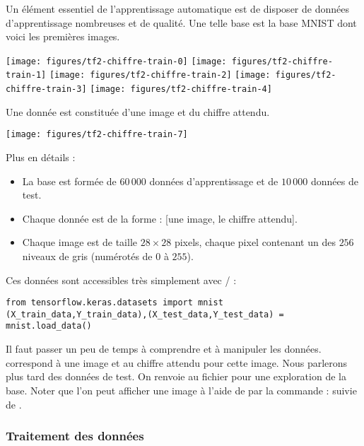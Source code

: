 \documentclass[11pt,class=report,crop=false]{standalone}
\begin{document}

Un élément essentiel de l'apprentissage automatique est de disposer de données d'apprentissage nombreuses et de qualité.
Une telle base est la base MNIST dont voici les premières images.
\begin{center}
\texttt{[image: figures/tf2-chiffre-train-0]}
\texttt{[image: figures/tf2-chiffre-train-1]}
\texttt{[image: figures/tf2-chiffre-train-2]}
\texttt{[image: figures/tf2-chiffre-train-3]}
\texttt{[image: figures/tf2-chiffre-train-4]}
\end{center}

Une donnée est constituée d'une image et du chiffre attendu.
\begin{center}
\texttt{[image: figures/tf2-chiffre-train-7]}
\end{center}

Plus en détails :
\begin{itemize}
  \item La base est formée de $60\,000$ données d'apprentissage et de $10\,000$ données de test.
  \item Chaque donnée est de la forme : [une image, le chiffre attendu].
  \item Chaque image est de taille $28\times28$ pixels, chaque pixel contenant un des $256$ niveaux de gris (numérotés de $0$ à $255$).
\end{itemize}



Ces données sont accessibles très simplement avec \tensorflow/\keras{} :
\begin{lstlisting}
from tensorflow.keras.datasets import mnist
(X_train_data,Y_train_data),(X_test_data,Y_test_data) = mnist.load_data()
\end{lstlisting} 

Il faut passer un peu de temps à comprendre et à manipuler les données.
 correspond à une image et  au chiffre attendu pour cette image. Nous parlerons plus tard des données de test.
On renvoie au fichier  pour une exploration de la base. Noter que l'on peut afficher une image à l'aide de \matplotlib{} par la commande :
suivie de .

\subsubsection*{Traitement des données}
\end{document}
